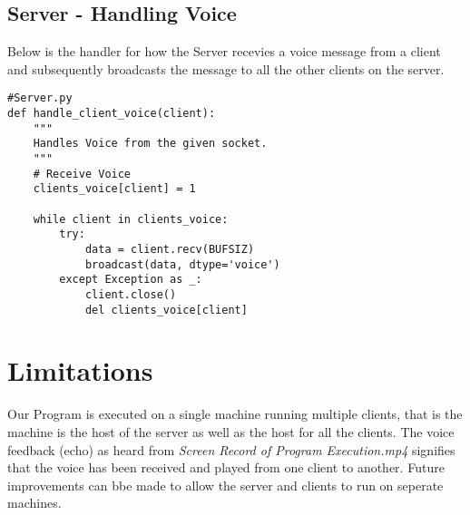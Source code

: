 \documentclass[a4paper,11pt]{article}
\begin{document}
\subsection{Server - Handling Voice}
Below is the handler for how the Server recevies a voice message from a client and subsequently broadcasts the message to all the other clients on the server.
\begin{mdframed}[backgroundcolor=light-gray, roundcorner=30pt,leftmargin=1, rightmargin=1, innerleftmargin=5, innertopmargin=-3,innerbottommargin=5, outerlinewidth=1, linecolor=light-gray]
\begin{lstlisting}
#Server.py
def handle_client_voice(client):
	"""
	Handles Voice from the given socket.
 	"""
	# Receive Voice
	clients_voice[client] = 1

	while client in clients_voice:
		try:
			data = client.recv(BUFSIZ)
			broadcast(data, dtype='voice')
		except Exception as _:
			client.close()
			del clients_voice[client]

\end{lstlisting}
\end{mdframed}

\section{Limitations}
Our Program is executed on a single machine running multiple clients, that is the machine is the host of the server as well as the host for all the clients. The voice feedback (echo) as heard from \textit{Screen Record of Program Execution.mp4} signifies that the voice has been received and played from one client to another. Future improvements can bbe made to allow the server and clients to run on seperate machines.
\end{document}
